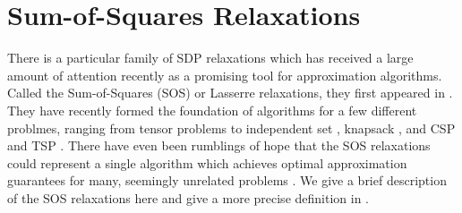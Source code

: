
\section{Sum-of-Squares Relaxations}
There is a particular family of SDP relaxations which has received a large amount of attention recently as a promising tool for approximation algorithms. Called the Sum-of-Squares (SOS) or Lasserre relaxations, they first appeared in \cite{Las01}. They have recently formed the foundation of algorithms for a few different problmes, ranging from tensor problems \cite{TS15,PS17,BKS15,HSS15} to independent set \cite{CS08}, knapsack \cite{KMN10}, and \textsc{CSP} and \textsc{TSP} \cite{LRST14,RT12}. There have even been rumblings of hope that the SOS relaxations could represent a single algorithm which achieves optimal approximation guarantees for many, seemingly unrelated problems \cite{BS14}. We give a brief description of the SOS relaxations here and give a more precise definition in . 

